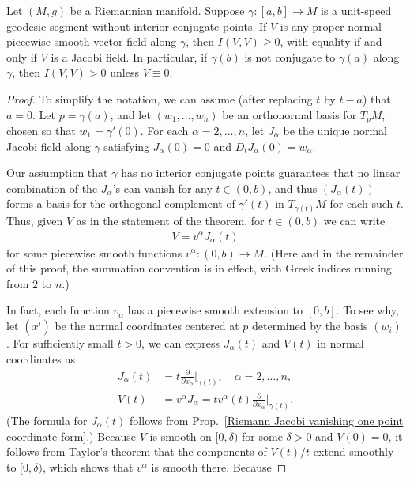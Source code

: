 \begin{theorem}\label{Riemann no int conjugate}
Let $(M,g)$ be a Riemannian manifold. Suppose $\gamma:[a,b]\to M$ is a unit-speed geodesic segment without interior conjugate points. If $V$ is any proper normal 
piecewise smooth vector field along $\gamma$, then $I(V,V)\geq 0$, with equality if and only if $V$ is a Jacobi field. In particular, if $\gamma(b)$ is not conjugate 
to $\gamma(a)$ along $\gamma$, then $I(V,V)>0$ unless $V\equiv 0$.
\end{theorem}
\begin{proof}
To simplify the notation, we can assume (after replacing $t$ by $t-a$) that $a=0$. Let $p=\gamma(a)$, and let $(w_1,\dots,w_n)$ be an orthonormal basis for $T_pM$, 
chosen so that $w_1=\gamma'(0)$. For each $\alpha=2,\dots,n$, let $J_\alpha$ be the unique normal Jacobi field along $\gamma$ satisfying $J_\alpha(0)=0$ and 
$D_tJ_\alpha(0)=w_\alpha$.\par
Our assumption that $\gamma$ has no interior conjugate points guarantees that no linear combination of the $J_\alpha$'s can vanish for any $t\in(0,b)$, and thus $(J_\alpha(t))$ 
forms a basis for the orthogonal complement of $\gamma'(t)$ in $T_{\gamma(t)}M$ for each such $t$. Thus, given $V$ as in the statement of the theorem, for $t\in(0,b)$ 
we can write
\begin{align*}
V=v^\alpha J_\alpha(t)
\end{align*}
for some piecewise smooth functions $v^\alpha:(0,b)\to M$. (Here and in the remainder of this proof, the summation convention is in effect, with Greek indices running from 
$2$ to $n$.)\par
In fact, each function $v_\alpha$ has a piecewise smooth extension to $[0,b]$. To see why, let $(x^i)$ be the normal coordinates centered at $p$ determined by the basis 
$(w_i)$. For sufficiently small $t>0$, we can express $J_\alpha(t)$ and $V(t)$ in normal coordinates as
\begin{align*}
J_\alpha(t)&=t\frac{\partial}{\partial x_\alpha}\Big|_{\gamma(t)},\quad \alpha=2,\dots,n,\\
V(t)&=v^\alpha J_\alpha=tv^\alpha(t)\frac{\partial}{\partial x_\alpha}\Big|_{\gamma(t)}.
\end{align*}
(The formula for $J_\alpha(t)$ follows from Prop.~\ref{Riemann Jacobi vanishing one point coordinate form}.) Because $V$ is smooth on $[0,\delta)$ for some $\delta>0$ 
and $V(0)=0$, it follows from Taylor's theorem that the components of $V(t)/t$ extend smoothly to $[0,\delta)$, which shows that $v^\alpha$ is smooth there. Because 

\end{proof}
